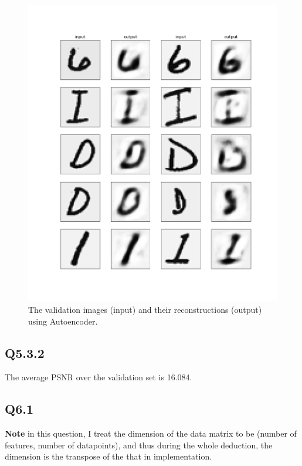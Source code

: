 \documentclass[11pt]{article}
\begin{document}
\begin{figure}[h!]
    \centering
    \includegraphics[width=.8\linewidth]{../results/q5_3_1.png}
    \caption{The validation images (input) and their reconstructions (output) using Autoencoder. }
    \label{fig:q5.3.1}
\end{figure}

\newpage

\subsection*{Q5.3.2}

The average PSNR over the validation set is 16.084.

\newpage

\subsection*{Q6.1}

\newcommand{\bX}{\mathbf{X}}
\newcommand{\bA}{\mathbf{A}}
\newcommand{\bC}{\mathbf{C}}
\newcommand{\bU}{\mathbf{U}}
\newcommand{\bu}{\mathbf{u}}
\newcommand{\bV}{\mathbf{V}}
\newcommand{\bv}{\mathbf{v}}
\newcommand{\bS}{\mathbf{S}}

\textbf{Note} in this question, I treat the dimension of the data matrix to be (number of features, number of datapoints), and thus during the whole deduction, the dimension is the transpose of the that in implementation.
\end{document}
